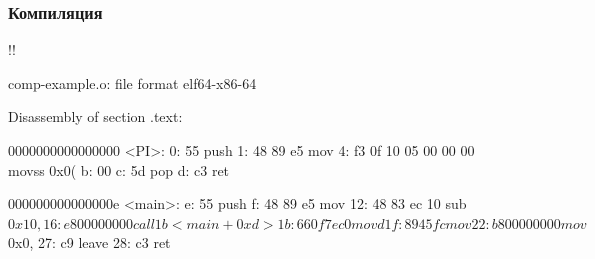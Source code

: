 \documentclass[compress, 8pt, aspectratio=169]{beamer}
\begin{document}

\begin{frame}[fragile]

    \frametitle{Компиляция}

            \begin{terminalwindow}
!!

comp-example.o:     file format elf64-x86-64


Disassembly of section .text:

0000000000000000 <PI>:
   0:   55                      push   %
   1:   48 89 e5                mov    %
   4:   f3 0f 10 05 00 00 00    movss  0x0(%
   b:   00 
   c:   5d                      pop    %
   d:   c3                      ret

000000000000000e <main>:
   e:   55                      push   %
   f:   48 89 e5                mov    %
  12:   48 83 ec 10             sub    $0x10,%
  16:   e8 00 00 00 00          call   1b <main+0xd>
  1b:   66 0f 7e c0             movd   %
  1f:   89 45 fc                mov    %
  22:   b8 00 00 00 00          mov    $0x0,%
  27:   c9                      leave
  28:   c3                      ret
            \end{terminalwindow}

\end{frame}

\end{document}
